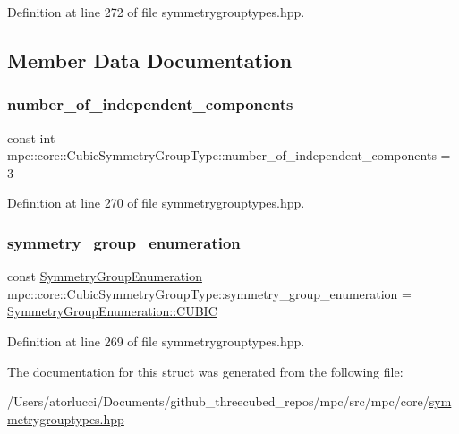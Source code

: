 Definition at line 272 of file symmetrygrouptypes.\+hpp.



\subsection{Member Data Documentation}
\mbox{\label{structmpc_1_1core_1_1_cubic_symmetry_group_type_a4e0518ed7fc1d0ab8e04cf7f549b62a5}} 
\subsubsection{\texorpdfstring{number\+\_\+of\+\_\+independent\+\_\+components}{number\_of\_independent\_components}}
{\footnotesize\ttfamily const int mpc\+::core\+::\+Cubic\+Symmetry\+Group\+Type\+::number\+\_\+of\+\_\+independent\+\_\+components = 3}



Definition at line 270 of file symmetrygrouptypes.\+hpp.

\mbox{\label{structmpc_1_1core_1_1_cubic_symmetry_group_type_a9418ba4ab74fc37ae6ef6faa0d2aeca0}} 
\subsubsection{\texorpdfstring{symmetry\+\_\+group\+\_\+enumeration}{symmetry\_group\_enumeration}}
{\footnotesize\ttfamily const \mbox{\hyperlink{namespacempc_1_1core_a9d979684062547055a0ef5c13077bad8}{Symmetry\+Group\+Enumeration}} mpc\+::core\+::\+Cubic\+Symmetry\+Group\+Type\+::symmetry\+\_\+group\+\_\+enumeration = \mbox{\hyperlink{namespacempc_1_1core_a9d979684062547055a0ef5c13077bad8accd681e34e5e40fbce74618c3ccffcff}{Symmetry\+Group\+Enumeration\+::\+C\+U\+B\+IC}}}



Definition at line 269 of file symmetrygrouptypes.\+hpp.



The documentation for this struct was generated from the following file\+:\begin{DoxyCompactItemize}
\item 
/\+Users/atorlucci/\+Documents/github\+\_\+threecubed\+\_\+repos/mpc/src/mpc/core/\mbox{\hyperlink{symmetrygrouptypes_8hpp}{symmetrygrouptypes.\+hpp}}\end{DoxyCompactItemize}
